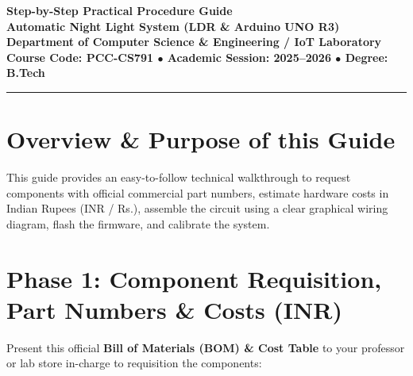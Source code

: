 \documentclass[12pt,a4paper]{article}
\begin{document}
\begin{center}
    {\LARGE\bfseries\color{primaryDark} Step-by-Step Practical Procedure Guide}\\[0.08cm]
    {\Large\bfseries Automatic Night Light System (LDR \& Arduino UNO R3)}\\[0.06cm]
    {\normalsize\textbf{Department of Computer Science \& Engineering / IoT Laboratory}}\\[0.04cm]
    {\footnotesize\textbf{Course Code: PCC-CS791 \quad $\bullet$ \quad Academic Session: 2025--2026 \quad $\bullet$ \quad Degree: B.Tech}}
\end{center}
\vspace{-0.35cm}
\rule{\textwidth}{1.0pt}
\vspace{0.05cm}

\section*{Overview \& Purpose of this Guide}
This guide provides an easy-to-follow technical walkthrough to request components with official commercial part numbers, estimate hardware costs in Indian Rupees (INR / Rs.), assemble the circuit using a clear graphical wiring diagram, flash the firmware, and calibrate the system.

\section*{Phase 1: Component Requisition, Part Numbers \& Costs (INR)}

Present this official \textbf{Bill of Materials (BOM) \& Cost Table} to your professor or lab store in-charge to requisition the components:
\end{document}
